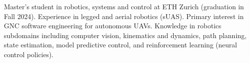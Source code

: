 

\begin{cvparagraph}

Master's student in robotics, systems and control at ETH Zurich (graduation in Fall 2024). Experience in legged and aerial robotics (sUAS). Primary interest in GNC software engineering for autonomous UAVs. Knowledge in robotics subdomains including computer vision, kinematics and dynamics, path planning, state estimation, model predictive control, and reinforcement learning (neural control policies).

\end{cvparagraph}
